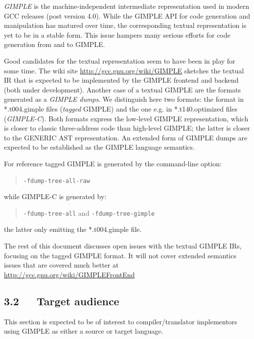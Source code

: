 \documentclass[a4paper]{article}
\begin{document}
\emph{GIMPLE} is the machine-independent intermediate representation used in modern
GCC releases (post version 4.0). While the GIMPLE API for code generation and
manipulation has matured over time, the corresponding textual representation
is yet to be in a stable form. This issue hampers many serious efforts for
code generation from and to GIMPLE.

Good candidates for the textual representation seem to have been in play for
some time. The wiki site \url{http://gcc.gnu.org/wiki/GIMPLE} sketches the textual
IR that is expected to be implemented by the GIMPLE frontend and backend
(both under development). Another case of a textual GIMPLE are the formats
generated as a \emph{GIMPLE dumps}. We distinguish here two formats: the format
in *.t004.gimple files (\emph{tagged} GIMPLE) and the one e.g. in *.t140.optimized
files (\emph{GIMPLE-C}). Both formats express the low-level GIMPLE representation,
which is closer to classic three-address code than high-level GIMPLE; the latter
is closer to the GENERIC AST representation. An extended form of GIMPLE dumps
are expected to be established as the GIMPLE language semantics.

For reference tagged GIMPLE is generated by the command-line option:
%
\begin{quote}

\texttt{-fdump-tree-all-raw}

\end{quote}

while GIMPLE-C is generated by:
%
\begin{quote}

\texttt{-fdump-tree-all} and \texttt{-fdump-tree-gimple}

\end{quote}

the latter only emitting the *.t004.gimple file.

The rest of this document discusses open issues with the textual GIMPLE IRs,
focusing on the tagged GIMPLE format. It will not cover extended semantics
issues that are covered much better at \url{http://gcc.gnu.org/wiki/GIMPLEFrontEnd}


\subsection{3.2~~~Target audience%
  \label{target-audience}%
}

This section is expected to be of interest to compiler/translator implementors
using GIMPLE as either a source or target language.
\end{document}

